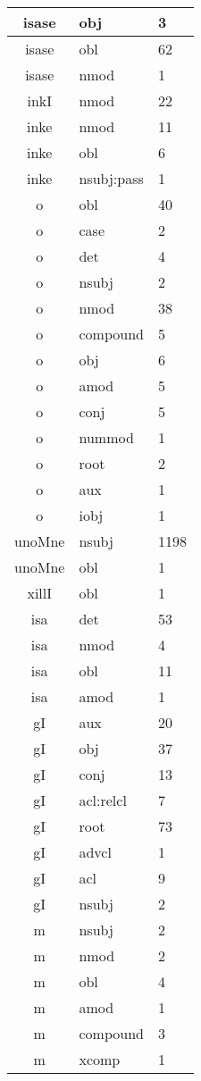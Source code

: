 \documentclass[a4 paper]{article}
\begin{document}
\begin{longtable}{cp{}p{}}
isase & obj & 3\\ \midrule isase & obl & 62\\ \midrule isase & nmod & 1\\ \midrule 
inkI & nmod & 22\\ \midrule 
inke & nmod & 11\\ \midrule inke & obl & 6\\ \midrule inke & nsubj:pass & 1\\ \midrule 
o & obl & 40\\ \midrule o & case & 2\\ \midrule o & det & 4\\ \midrule o & nsubj & 2\\ \midrule o & nmod & 38\\ \midrule o & compound & 5\\ \midrule o & obj & 6\\ \midrule o & amod & 5\\ \midrule o & conj & 5\\ \midrule o & nummod & 1\\ \midrule o & root & 2\\ \midrule o & aux & 1\\ \midrule o & iobj & 1\\ \midrule 
unoMne & nsubj & 1198\\ \midrule unoMne & obl & 1\\ \midrule 
xillI & obl & 1\\ \midrule 
isa & det & 53\\ \midrule isa & nmod & 4\\ \midrule isa & obl & 11\\ \midrule isa & amod & 1\\ \midrule 
gI & aux & 20\\ \midrule gI & obj & 37\\ \midrule gI & conj & 13\\ \midrule gI & acl:relcl & 7\\ \midrule gI & root & 73\\ \midrule gI & advcl & 1\\ \midrule gI & acl & 9\\ \midrule gI & nsubj & 2\\ \midrule 
m & nsubj & 2\\ \midrule m & nmod & 2\\ \midrule m & obl & 4\\ \midrule m & amod & 1\\ \midrule m & compound & 3\\ \midrule m & xcomp & 1\\ \midrule 

\end{longtable}
\end{document}
